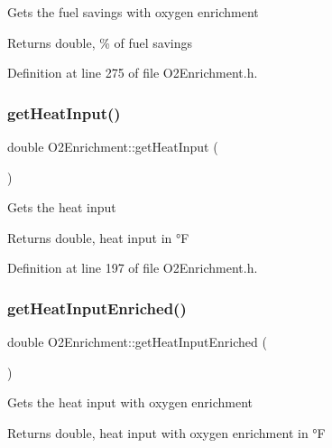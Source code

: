 Gets the fuel savings with oxygen enrichment \begin{DoxyReturn}{Returns}
double, \% of fuel savings 
\end{DoxyReturn}


Definition at line 275 of file O2\+Enrichment.\+h.

\mbox{\label{class_o2_enrichment_a3a9fb23728ab5831e47cb5aafb438439}} 
\subsubsection{\texorpdfstring{get\+Heat\+Input()}{getHeatInput()}}
{\footnotesize\ttfamily double O2\+Enrichment\+::get\+Heat\+Input (\begin{DoxyParamCaption}{ }\end{DoxyParamCaption})\hspace{0.3cm}{\ttfamily [inline]}}

Gets the heat input \begin{DoxyReturn}{Returns}
double, heat input in °F 
\end{DoxyReturn}


Definition at line 197 of file O2\+Enrichment.\+h.

\mbox{\label{class_o2_enrichment_ac1d74fe5a8791b9a8bc596bcb19b8b1e}} 
\subsubsection{\texorpdfstring{get\+Heat\+Input\+Enriched()}{getHeatInputEnriched()}}
{\footnotesize\ttfamily double O2\+Enrichment\+::get\+Heat\+Input\+Enriched (\begin{DoxyParamCaption}{ }\end{DoxyParamCaption})\hspace{0.3cm}{\ttfamily [inline]}}

Gets the heat input with oxygen enrichment \begin{DoxyReturn}{Returns}
double, heat input with oxygen enrichment in °F 
\end{DoxyReturn}


